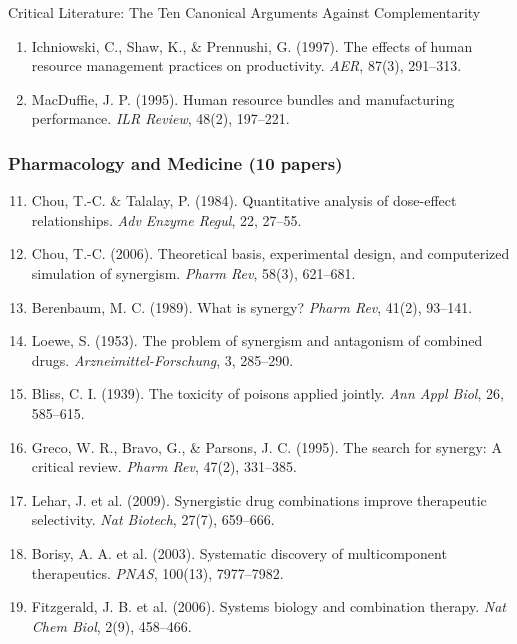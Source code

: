 \begin{chapter}{Critical Literature: The Ten Canonical Arguments Against Complementarity}
\begin{enumerate}
    \item Ichniowski, C., Shaw, K., \& Prennushi, G. (1997). The effects of human resource management practices on productivity. \textit{AER}, 87(3), 291--313.

    \item MacDuffie, J. P. (1995). Human resource bundles and manufacturing performance. \textit{ILR Review}, 48(2), 197--221.
\end{enumerate}

\subsubsection{Pharmacology and Medicine (10 papers)}

\begin{enumerate}
    \setcounter{enumi}{10}
    \item Chou, T.-C. \& Talalay, P. (1984). Quantitative analysis of dose-effect relationships. \textit{Adv Enzyme Regul}, 22, 27--55.

    \item Chou, T.-C. (2006). Theoretical basis, experimental design, and computerized simulation of synergism. \textit{Pharm Rev}, 58(3), 621--681.

    \item Berenbaum, M. C. (1989). What is synergy? \textit{Pharm Rev}, 41(2), 93--141.

    \item Loewe, S. (1953). The problem of synergism and antagonism of combined drugs. \textit{Arzneimittel-Forschung}, 3, 285--290.

    \item Bliss, C. I. (1939). The toxicity of poisons applied jointly. \textit{Ann Appl Biol}, 26, 585--615.

    \item Greco, W. R., Bravo, G., \& Parsons, J. C. (1995). The search for synergy: A critical review. \textit{Pharm Rev}, 47(2), 331--385.

    \item Lehar, J. et al. (2009). Synergistic drug combinations improve therapeutic selectivity. \textit{Nat Biotech}, 27(7), 659--666.

    \item Borisy, A. A. et al. (2003). Systematic discovery of multicomponent therapeutics. \textit{PNAS}, 100(13), 7977--7982.

    \item Fitzgerald, J. B. et al. (2006). Systems biology and combination therapy. \textit{Nat Chem Biol}, 2(9), 458--466.


\end{enumerate}
\end{chapter}
